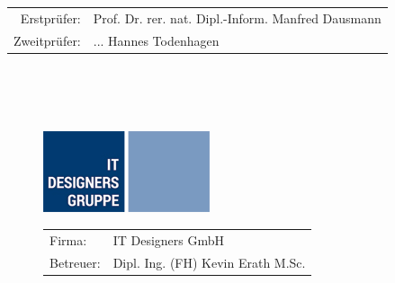 \begin{titlepage}
\begin{tabular}{rl}
		Erstprüfer: & Prof. Dr. rer. nat. Dipl.-Inform. Manfred Dausmann\\
		Zweitprüfer: & ... Hannes Todenhagen\\
	\end{tabular}
	~\\ ~\\ ~\\	
	\begin{figure}[H]
		\begin{minipage}{0.4\textwidth}
			\begin{center}
				\includegraphics[width=.8\textwidth]{images/itd_logo}
			\end{center}
		\end{minipage}%
		\begin{minipage}{0.7\textwidth}
			\begin{tabular}{ll}
				Firma: & IT Designers GmbH\\
				Betreuer: & Dipl. Ing. (FH) Kevin Erath M.Sc.
			\end{tabular}
		\end{minipage}
	\end{figure}
\end{titlepage}





